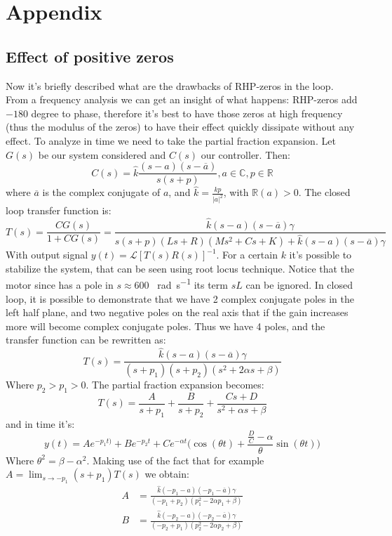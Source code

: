 \chapter*{Appendix}
\section{Effect of positive zeros}
Now it's briefly described what are the drawbacks of RHP-zeros in the loop. From  a frequency analysis we can get an insight of what happens: RHP-zeros add  $-180$ degree to phase, therefore it's best to have those zeros at high frequency (thus the modulus of the zeros) to have their effect quickly dissipate without any effect. To analyze in time we need to take the partial 	fraction expansion. Let $G(s)$ be our system considered and $C(s)$ our controller. Then:
$$C(s) = \hat{k}\frac{(s-a)(s-\overline{a})}{s(s+p)}, a \in \mathbb{C}, p \in \mathbb{R}$$
where $\overline{a}$ is the complex conjugate of $a$, and $\hat{k}=\frac{kp}{|a|^2}$, with $\mathbb{R}(a) > 0$. 
The closed loop transfer function is:
$$T(s) = \frac{CG(s)}{1+CG(s)} = \frac{\hat{k}(s-a)(s-\overline{a})\gamma}{s(s+p)(Ls+R)(Ms^2+Cs+K)+\hat{k}(s-a)(s-\overline{a})\gamma}$$
With output signal $y(t) = \mathcal{L}[T(s)R(s)]^{-1}$.
For a certain $k$ it's possible to stabilize the system, that can be seen using root locus technique.
Notice that the motor since has a pole in $s \approx 600$ \SI{}{\radian \per \second} its term $sL$ can be ignored. In closed loop, it is possible to demonstrate that we have 2 complex conjugate poles in the left half plane, and two negative poles on the real axis that if the gain increases more will become complex conjugate poles. Thus we have 4 poles, and the transfer function can be rewritten as:
$$T(s) = \frac{\hat{k}(s-a)(s-\overline{a})\gamma}{(s+p_{1})(s+p_{2})(s^2+2\alpha s+\beta)}
$$
Where $p_2>p_1 >0 $. The partial fraction expansion becomes:
$$T(s) = \frac{A}{s+p_1} + \frac{B}{s+p_2} +\frac{Cs+D}{s^2+\alpha s+\beta}$$
and in time it's:
$$y(t) = Ae^{-p_1 t)}+ Be^{-p_2 t} +Ce^{-\alpha t}\Big (\cos(\theta t)+ \frac{\frac{D}{C}-\alpha}{\theta} \sin(\theta t) \Big)$$
Where $\theta^2 =  \beta -\alpha^2$. 
Making use of the fact that for example $A = \lim_{s \to -p_1} (s+p_1)T(s)$ we obtain:
\begin{align*}A &= \frac{\hat{k}(-p_1-a)(-p_1-\overline{a})\gamma}{(-p_1+p_2)(p_1^2-2\alpha p_1+\beta)}\\
B &= \frac{\hat{k}(-p_2-a)(-p_2-\overline{a})\gamma}{(-p_2+p_1)(p_2^2-2\alpha p_2+\beta)}
\end{align*}
